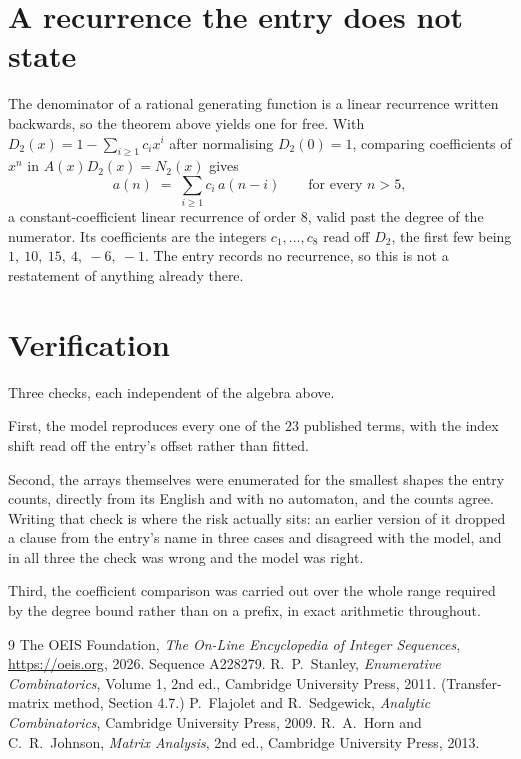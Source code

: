 \documentclass[11pt,a4paper]{article}
\theoremstyle{plain}
\theoremstyle{definition}
\begin{document}
\section{A recurrence the entry does not state}

The denominator of a rational generating function is a linear recurrence written backwards, so
the theorem above yields one for free. With $D_2(x)=1-\sum_{i\ge1}c_ix^i$ after normalising
$D_2(0)=1$, comparing coefficients of $x^n$ in $A(x)D_2(x)=N_2(x)$ gives
\[
a(n)\;=\;\sum_{i\ge1}c_i\,a(n-i)\qquad\text{for every }n>5,
\]
a constant-coefficient linear recurrence of order $8$, valid past the degree of the
numerator. Its coefficients are the integers $c_1,\dots,c_{8}$ read off $D_2$, the first few being $1,\ 10,\ 15,\ 4,\ -6,\ -1$. The entry records no recurrence, so this is not a restatement of anything
already there.

\section{Verification}

Three checks, each independent of the algebra above.

First, the model reproduces every one of the $23$ published terms, with the index shift
read off the entry's offset rather than fitted.

Second, the arrays themselves were enumerated for the smallest shapes the entry counts,
directly from its English and with no automaton, and the counts agree. Writing that check is
where the risk actually sits: an earlier version of it dropped a clause from the entry's name
in three cases and disagreed with the model, and in all three the check was wrong and the model
was right.

Third, the coefficient comparison was carried out over the whole range required by the degree
bound rather than on a prefix, in exact arithmetic throughout.

\begin{thebibliography}{9}
 The OEIS Foundation, \emph{The On-Line Encyclopedia of Integer
Sequences}, \url{https://oeis.org}, 2026. Sequence A228279.
 R.~P.~Stanley, \emph{Enumerative Combinatorics}, Volume 1, 2nd ed.,
Cambridge University Press, 2011. (Transfer-matrix method, Section 4.7.)
 P.~Flajolet and R.~Sedgewick, \emph{Analytic Combinatorics}, Cambridge
University Press, 2009.
 R.~A.~Horn and C.~R.~Johnson, \emph{Matrix Analysis}, 2nd ed., Cambridge
University Press, 2013.
\end{thebibliography}
\end{document}
